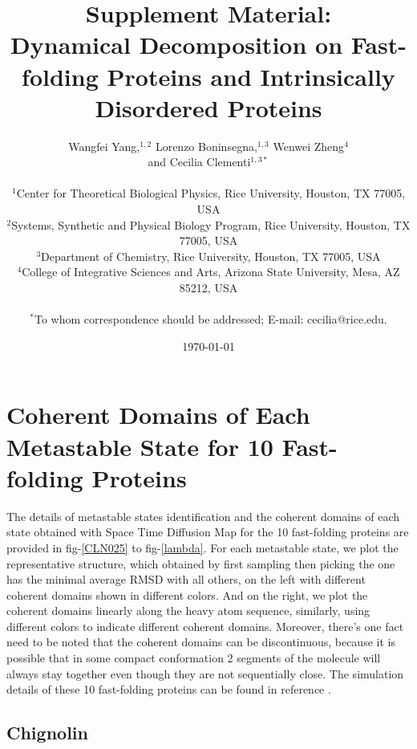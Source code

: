 \documentclass[12pt]{article}
\title{Supplement Material:\\ Dynamical Decomposition on Fast-folding Proteins and Intrinsically Disordered Proteins}
\author
{Wangfei Yang,$^{1,2}$ Lorenzo Boninsegna,$^{1,3}$ Wenwei Zheng$^{4}$\\ and Cecilia Clementi$^{1,3\ast}$\\
\\
\normalsize{$^{1}$Center for Theoretical Biological Physics, Rice University, Houston, TX 77005, USA}\\
\normalsize{$^{2}$Systems, Synthetic and Physical Biology Program, Rice University, Houston, TX 77005, USA}\\
\normalsize{$^{3}$Department of Chemistry, Rice University, Houston, TX 77005, USA}\\
\normalsize{$^{4}$College of Integrative Sciences and Arts, Arizona State University, Mesa, AZ 85212, USA}\\
\\
\normalsize{$^\ast$To whom correspondence should be addressed; E-mail:  cecilia@rice.edu.}
}
\date{\today}
\begin{document}
\maketitle

\section*{Coherent Domains of Each Metastable State for 10 Fast-folding Proteins}

\setlength{\parindent}{2em}

The details of metastable states identification and the coherent domains of each state obtained with Space Time Diffusion Map for the 10 fast-folding proteins are provided in fig-\ref{CLN025} to fig-\ref{lambda}. For each metastable state, we plot the representative structure, which obtained by first sampling then picking the one has the minimal average RMSD with all others, on the left with different coherent domains shown in different colors. And on the right, we plot the coherent domains linearly along the heavy atom sequence, similarly, using different colors to indicate different coherent domains. Moreover, there's one fact need to be noted that the coherent domains can be discontinuous, because it is possible that in some compact conformation 2 segments of the molecule will always stay together even though they are not sequentially close. The simulation details of these 10 fast-folding proteins can be found in reference \cite{A3D_frustration}.

\clearpage

\subsection*{Chignolin}
\end{document}
